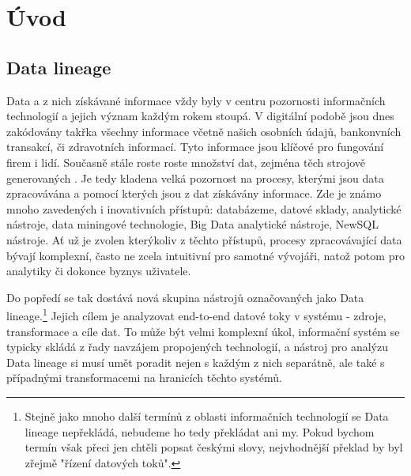 \chapter{Úvod}

\section{Data lineage}

Data a z nich získávané informace vždy byly v centru pozornosti informačních technologií a jejich význam každým rokem stoupá. V digitální podobě jsou dnes zakódovány takřka všechny informace včetně našich osobních údajů, bankonvních transakcí, či zdravotních informací. 
Tyto informace jsou klíčové pro fungování firem i lidí. %
Současně stále roste roste množství dat, zejména těch strojově generovaných . %
Je tedy kladena velká pozornost na procesy, kterými jsou data zpracovávána a pomocí kterých jsou z dat získávány informace. Zde je známo mnoho zavedených i inovativních přístupů:   databázeme, datové sklady,  analytické nástroje, data miningové technologie,  Big Data analytické nástroje, NewSQL nástroje. Ať už je zvolen kterýkoliv z těchto přístupů, procesy zpracovávající data bývají komplexní, často ne zcela intuitivní pro samotné vývojáři, natož potom pro analytiky či dokonce byznys uživatele. 

Do popředí se tak dostává nová skupina nástrojů označovaných jako Data lineage.\footnote{Stejně jako mnoho další termínů z oblasti informačních technologií se Data lineage nepřekládá, nebudeme ho tedy překládat ani my. Pokud bychom termín však přeci jen chtěli popsat českými slovy, nejvhodnější překlad by byl zřejmě "řízení datových toků".}
Jejich cílem je analyzovat end-to-end datové toky v systému - zdroje, transformace a cíle dat. To může být velmi komplexní úkol, informační systém se typicky skládá z řady navzájem propojených technologií, a nástroj pro analýzu Data lineage si musí umět poradit nejen s každým z nich separátně, ale také s případnými transformacemi na hranicích těchto systémů. 

